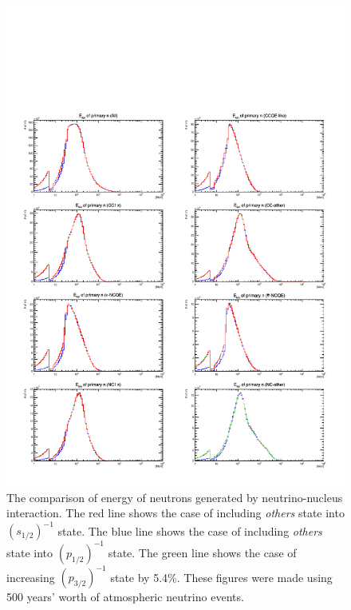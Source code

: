 \begin{figure}[h]
	\centering
	\includegraphics[width=16cm]{PDF/NEUT/Comparison/neutron/LogEnePri}
	\caption[The comparison of energy of neutrons generated by neutrino-nucleus interaction]{
	The comparison of energy of neutrons generated by neutrino-nucleus interaction.
	The red line shows the case of including \textit{others} state into $(s_{1/2})^{-1}$ state.
	The blue line shows the case of including \textit{others} state into $(p_{1/2})^{-1}$ state.
	The green line shows the case of increasing $(p_{3/2})^{-1}$ state by 5.4\%.
	These figures were made using 500 years' worth of atmospheric neutrino events.
	}\label{Comp_neutronLogEnePri}
\end{figure}





\newpage

